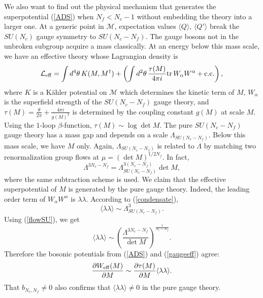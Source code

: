 \documentclass[lecture]{qft-l}
\newcommand{\al}{\alpha}
\newcommand{\lam}{\lambda}
\newcommand{\tht}{\theta}
\newcommand{\Lam}{\varLambda}
\newcommand{\bra}{\langle}
\newcommand{\ket}{\rangle}
\newcommand{\inv}[1]{\frac{1}{#1}}
\newcommand{\ii}{i}
\newcommand{\dr}{d}
\newcommand{\pdr}{\partial}
\newcommand{\cc}{{\rm c.c.}}
\newcommand{\tr}{{\rm tr}}
\newcommand{\LL}{{\mathcal L}}
\newcommand{\MM}{{\mathcal M}}
\newcommand{\eff}{_{{\rm eff}}}
\newcommand{\ka}{K\"ahler }
\newcommand{\QT}{Q'}%
\numberwithin{figure}{chapter}
\begin{document}
We also want to find out the physical mechanism that generates 
the superpotential (\ref{ADS}) when $N_f<N_c-1$ without embedding
the theory into a larger one.
At a generic point in $\MM$, expectation values $\bra Q\ket$, $\bra\QT\ket$ 
break the $SU(N_c)$ gauge symmetry to $SU(N_c-N_f)$.
The gauge bosons not in the unbroken subgroup acquire a mass classically.
At an energy below this mass scale,
we have an effective theory whose Lagrangian density is
	\begin{equation}\label{gaugeeff}
\LL\eff=\int\dr^4\tht\,K(M,M^\dagger)+
\left(\int\dr^2\tht\,\frac{\tau(M)}{4\pi\ii}\tr\,W_\al W^\al+\cc\right),
	\end{equation}
where $K$ is a \ka potential on $\MM$ which determines the kinetic term of $M$,
$W_\al$ is the superfield strength of the $SU(N_c-N_f)$ gauge theory,
and $\tau(M)=\frac{\tht}{2\pi}+\frac{4\pi\ii}{g(M)^2}$ is determined by 
the coupling constant $g(M)$ at scale $M$.
Using the $1$-loop $\beta$-function, $\tau(M)\sim\log\det M$.
The pure $SU(N_c-N_f)$ gauge theory has a mass gap and depends on a scale
$\Lam_{SU(N_c-N_f)}$.
Below this mass scale, we have $M$ only.
Again, $\Lam_{SU(N_c-N_f)}$ is related to $\Lam$ by matching two 
renormalization group flows at $\mu=(\det M)^{1/2N_f}$.
In fact,
	\begin{equation}\label{flowSU}
\Lam^{3N_c-N_f}=\Lam_{SU(N_c-N_f)}^{3(N_c-N_f)}\det M,
	\end{equation}
where the same subtraction scheme is used.
We claim that the effective superpotential of $M$ is generated by the pure 
gauge theory.
Indeed, the leading order term of $W_\al W^\al$ is $\lam\lam$.
According to (\ref{condensate}),
	\begin{equation}
\bra\lam\lam\ket\sim\Lam_{SU(N_c-N_f)}^3.
	\end{equation}
Using (\ref{flowSU}), we get
	\begin{equation}
\bra\lam\lam\ket\sim
\left(\frac{\Lam^{3N_c-N_f}}{\det M}\right)^{\inv{N_c-N_f}}.
	\end{equation}
Therefore the bosonic potentials from (\ref{ADS}) and (\ref{gaugeeff}) agree:
	\begin{equation}
\frac{\pdr W\eff(M)}{\pdr M}\sim\frac{\pdr\tau(M)}{\pdr M}\bra\lam\lam\ket.
	\end{equation}
That $b_{N_c,N_f}\ne0$ also confirms that $\bra\lam\lam\ket\ne0$ 
in the pure gauge theory.
\end{document}
